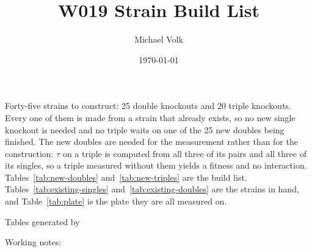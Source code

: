 \documentclass[10pt,a4paper]{article}
\title{\vspace{-1.5em}W019 Strain Build List}
\author{Michael Volk}
\date{\today}
\begin{document}
\maketitle
\thispagestyle{empty}

\noindent
Forty-five strains to construct: 25 double knockouts and 20 triple knockouts.
Every one of them is made from a strain that already exists, so no new single
knockout is needed and no triple waits on one of the 25 new doubles being
finished. The new doubles are needed for the measurement rather than for the
construction: $\tau$ on a triple is computed from all three of its pairs and all
three of its singles, so a triple measured without them yields a fitness and no
interaction. Tables~\ref{tab:new-doubles}
and~\ref{tab:new-triples} are the build list.
Tables~\ref{tab:existing-singles} and~\ref{tab:existing-doubles} are the strains
in hand, and Table~\ref{tab:plate} is the plate they are all measured on.

\vspace{0.5em}
{\small\color{tcgray}
Tables generated by \par
Working notes: \par}

\vspace{1em}
\tccontents





\clearpage

\end{document}
